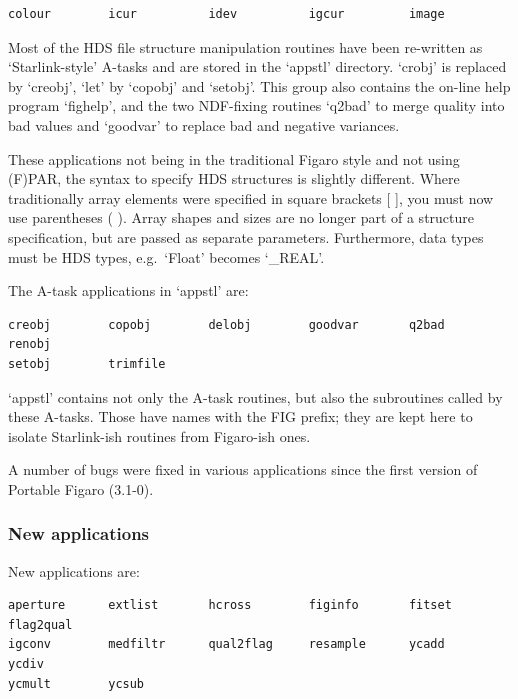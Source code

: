 \documentclass[11pt,twoside]{article}
\begin{document}
\begin{verbatim}
colour        icur          idev          igcur         image
\end{verbatim}

   Most of the HDS file structure manipulation routines have been
   re-written as `Starlink-style' A-tasks and are stored in the `appstl'
   directory. `crobj' is replaced by `creobj', `let' by `copobj' and
   `setobj'.  This group also contains the on-line help program
   `fighelp', and the two NDF-fixing routines `q2bad' to merge quality
   into bad values and `goodvar' to replace bad and negative variances.

   These applications not being in the traditional Figaro style and not
   using (F)PAR, the syntax to specify HDS structures is slightly
   different.  Where traditionally array elements
   were specified in square brackets [ ], you must now use parentheses
   ( ). Array shapes and sizes are no longer part of a structure
   specification, but are passed as separate parameters.  Furthermore,
   data types must be HDS types, e.g.\ `Float' becomes `\_REAL'.

   The A-task applications in `appstl' are:

\begin{verbatim}
creobj        copobj        delobj        goodvar       q2bad         renobj
setobj        trimfile
\end{verbatim}

   `appstl' contains not only the A-task routines, but also the
   subroutines called by these A-tasks. Those have names with the FIG
   prefix; they are kept here to isolate Starlink-ish routines from
   Figaro-ish ones.

   A number of bugs were fixed in various applications since the first
   version of Portable Figaro (3.1-0).


\subsubsection{\label{changessub3a}New applications}

   New applications are:

\begin{verbatim}
aperture      extlist       hcross        figinfo       fitset        flag2qual
igconv        medfiltr      qual2flag     resample      ycadd         ycdiv
ycmult        ycsub
\end{verbatim}
\end{document}
